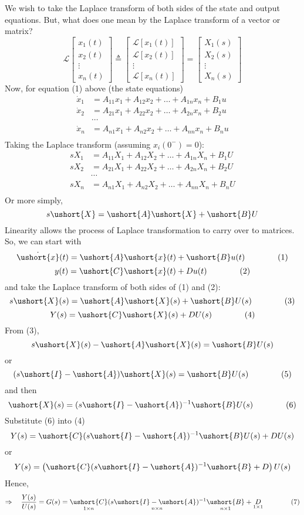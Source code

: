 \documentclass{book}
\newcommand{\LT}{\mathcal{L}}
\def\ubar#1{\ushort{#1}}
\begin{document}
We wish to take the Laplace transform of both sides of the state and output equations. But, what does one mean by the Laplace transform of a vector or matrix?
\[ \LT\left[\begin{array}{c} {x}_1(t)\\{x}_2(t)\\\vdots\\x_n(t) \end{array}\right] \triangleq \left[\begin{array}{c} \LT[{x}_1(t)] \\ \LT[{x}_2(t)] \\ \vdots \\ \LT[x_n(t)] \end{array}\right] = \left[\begin{array}{c} X_1(s)\\X_2(s)\\\vdots\\X_n (s)\end{array}\right] \]
Now, for equation (1) above (the state equations)
\begin{align*}
\dot{x}_1 &= A_{11} x_1 + A_{12}x_2 + \ldots + A_{1n} x_n + B_1 u\\
\dot{x}_2 &= A_{21} x_1 + A_{22}x_2 + \ldots + A_{2n} x_n + B_2 u\\
&\cdots\\
\dot{x}_n &= A_{n1} x_1 + A_{n2}x_2 + \ldots + A_{nn} x_n + B_n u\\
\end{align*}
Taking the Laplace transform (assuming $ x_i(0^-)=0 $):
\begin{align*}
sX_1 &= A_{11} X_1 + A_{12}X_2 + \ldots + A_{1n} X_n + B_1 U\\
sX_2 &= A_{21} X_1 + A_{22}X_2 + \ldots + A_{2n} X_n + B_2 U\\
&\cdots\\
sX_n &= A_{n1} X_1 + A_{n2}X_2 + \ldots + A_{nn} X_n + B_n U\\
\end{align*}
Or more simply,
\[ s\ubar{X} = \ubar{A}\ubar{X} + \ubar{B}U \]
Linearity allows the process of Laplace transformation to carry over to matrices. So, we can start with 
\[ \dot{\ubar{x}}(t) = \ubar{A}\ubar{x}(t) + \ubar{B}u(t) \qquad\qquad (1)\]
\[ y(t) = \ubar{C}\ubar{x}(t)+Du(t) \qquad\qquad (2) \]
and take the Laplace transform of both sides  of (1) and (2):
\[ s\ubar{X}(s)  = \ubar{A}\ubar{X}(s)  + \ubar{B}U(s)  \qquad\qquad (3) \]
\[ Y(s)  = \ubar{C}\ubar{X}(s)  + DU(s)  \qquad\qquad (4) \]
From (3),
\[ s\ubar{X}(s) -\ubar{A}\ubar{X}(s)  =  \ubar{B}U(s)  \]
or
\[ (s\ubar{I}-\ubar{A})\ubar{X}(s)  =  \ubar{B}U(s)  \qquad\qquad (5) \]
and then
\[ \ubar{X}(s)  =  (s\ubar{I}-\ubar{A})^{-1}\ubar{B}U(s)  \qquad\qquad (6) \]
Substitute (6) into (4)
\[ Y(s)  = \ubar{C}(s\ubar{I}-\ubar{A})^{-1}\ubar{B}U(s)  + DU(s)  \]
or
\[ Y(s)  = \left(\ubar{C}(s\ubar{I}-\ubar{A})^{-1}\ubar{B}  + D\right)U(s)  \]
Hence,
\[ \Rightarrow\quad \frac{Y(s)}{U(s)} = G(s) = \underset{1\times n}{\ubar{C}}\underset{n\times n}{(s\ubar{I}-\ubar{A})^{-1}}\underset{n\times1}{\ubar{B}}  + \underset{1\times1}{D} \qquad\qquad (7)\]
\end{document}
